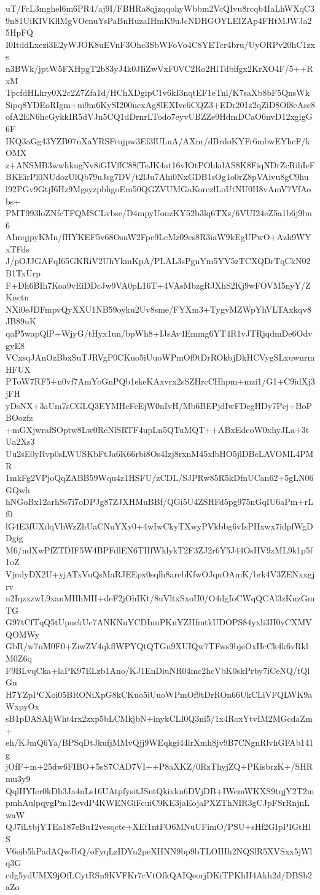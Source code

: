 uT/FcL3mghel6m6PR4/aj9I/FBHRa8qjzqqohyWbbm2VcQIvu8rcqb4IaLhWXqC3
9n81UiKIVKllMgVOenuYsPaBnHuzaIHmK9uJcNDHGOYLEIZAp4FHtMJWJa25HpFQ
I0ItddLxezi3E2yWJOK8uEVnF3Ohc3SbWFoVo4C8YETcr4bru/UyORPv20hC1zxs
n3BWk/jptW5FXHpgT2b83yJ4k0JIiZwVxF0VC2Ro2HlTdbifgx2KrXO4F/5++RxM
TpcfdHLhry0X2c2Z7Zfa1d/HChXDgipC1v6kI3nqtEF1eTnl/K7saXb8bF5QnsWk
Sipq8YDEoRIgm+m9m6KySI200ncxAg8lEXIvc6CQZ3+EDr201z2qZiD8Of8eAse8
ofA2EN6hcGykkIR5dVJn5CQ1dDrnrLTodo7eyvUBZZe9HdmDCaO6nvD12xglgG6F
IKQ3aGg43YZB07nXaYRSFrujpw3Ef3lULuA/AXnr/dBrdoKYFr6mbwEYhcF/kOMX
z+ANSMB3wwhkugNv8iGIVffC88fTeJK4at16vIOtPOhkdAS8K8FiqNDrZcRihIeF
BKEirPl0NUdozUlQb79uJsg7DV/t2lJu7Ahi0NxGDB1sOg1o0rZ8pVAivu8gC9hu
l92PGv9GtjI6Hz9MgsyzpbhgoEm50QGZVUMGaKorezlLoUtNU0H8vAmV7VfAobs+
PMT993loZNfcTFQMSCLvbse/D4mpyUouzKY52b3lq6TXs/6VUI24eZ5a1b6j9bn6
AImqjpyKMn/fHYKEF5v68OsnW2Fpc9LeMz09cs8R3iaW9kEgUPwO+Azh9WYxTFds
J/pOJJGAFqI65GKRiV2UhYkmKpA/PLAL3sPgnYm5YV5zTCXQDrTqCkN02B1TxUrp
F+Dh6BIh7Koa9vEiDDcJw9VA0pL16T+4VAsMbzgRJXhS2Kj9wFOVM5nyY/ZKnctn
NXi0eJDFmpvQyXXU1NB59oyku2Uv8sme/FYXm3+TygvMZWpYhVLTAxkqv8JB89uK
qaP5wapQlP+WjyG/tHyx1un/bpWh8+IJsAv4Emmg6YT4R1vJTRjqdmDe6OdvgvE8
VCxsqJAnOzBbxSuTJRVgP0CKuo5iUuoWPmOf9tDrROkbjDkHCVygSLxuwnrmHFUX
PToW7RF5+n0vf7AmYoGnPQb1ekeKAxvrx2sSZHrcCHhpm+mzi1/G1+C9idXj3jFH
yDsNX+3aUm7sCGLQ3EYMHcFcEjW0nIvH/Mb6BEPjdIwFDegHDy7Pcj+HoPBOozfz
+mGXjwrafSOptw8Lw0RcNlSRTF4upLn5QTuMQT++ABxEdcoW0xhyJLa+3tUa2Xs3
Uu2sE0yRvp0sLWUSKbFtJa6K66rbi8Os4Izj8rxnM45xlbHO5jlDBcLAVOML4PMR
1mkFg2VPjoQqZABB59Wqu4z1HSFU/zCDL/SJPRw85R5kDfnUCan62+5gLN06GQwh
hNGoBx12arhSs7i7oDPJg87ZJXHMuBBf/QGi5U4ZSHFd5pg975nGqIU6aPm+rLf0
lG4E3fUXdqVhWzZhUaCNuYXy0+4wIwCkyTXwyPVkbbg6vIsPHxwx7idpfWgDDgig
M6/ndXwPfZTDIF5W4BPFdlEN6THfWklykT2F3ZJ2r6Y5J44OsHV9zML9k1p5f1oZ
VjndyDX2U+yjATxVuQsMaRJEEpx0sqlh8arebKfwOJqnOAmK/brk4V3ZENxxgjrv
n2IqzxzwL9xanMHhMH+deF2jOhIKt/8uVltxSxoH0/O4dgIoCWqQCAl3zKnzGmTG
G97tCfTqQ5tUpuckUc7ANKNuYCDIunPKnYZHfmtkUDOPS84yxli3H0yCXMVQOMWy
GbR/w7uM0F0+ZiwZV4qkflWPYQtQTGn9XUIQw7TFws9bjeOxHcCk4k6vRklM0Z6q
F9BLvqCka+laPK97ELzb1Ano/KJ1EnDiuNR04mc2hcVbK0skPrby7iCeNQ/tQlGu
H7YZpPCXoi05BRONiXpG8kCKuo5iUuoWPmOf9tDrROn66UkCLiVFQLWK9aWxpyOx
sB1pDASAljWht4rx2zxp5bLCMkjbN+inykCLI0Q3ni5/1x4RoxYtvIM2MGcdaZm+
eh/KJmQ6Ya/BPSqDtJkufjMMvQjj9WEqkgi44lrXmh8jv9B7CNgnRlvhGFAb141g
jOfF+m+25dw6FIBO+5sS7CAD7VI++P8aXKZ/0RzThyjZQ+PKisbrzK+/SHRmu3y9
QqlHYIer0kDh3Ja4nLs16UAtpfysitJSntQkixkn6DVjDB+IWemWKXS9tqjY2T2m
pmhAulpqygPm12evdP4KWENGiFcuiC9KE3jaEojaPXZThNIR3gCJpFSrRnjnLwaW
QJ7iLtbjYTEa187eBu12vesqcte+XEf1ntFO6MNuUFimO/PSU+sHf2GIpPIGtHlS
V6eib5kPadAQwJbQ/oFyqLzIDYu2peXHNN9bp9bTLOIHh2NQSlR5XVSxx5jWlq3G
cdg5ydUMX9jOfLCytRSn9KVFKr7cVtOfkQAIQeorjDKiTPKhH4Akh2d/DBSb2aZo
